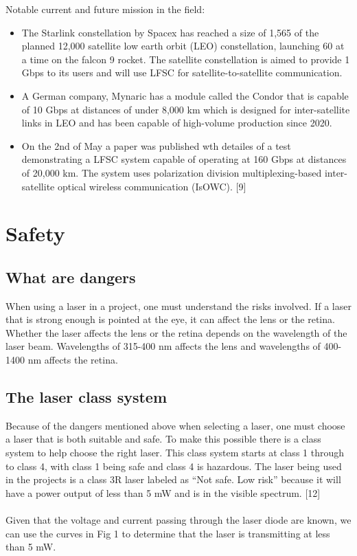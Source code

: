 \documentclass[conference]{IEEEtran}
\begin{document}
Notable current and future mission in the field:

\begin{itemize}
    \item The Starlink constellation by Spacex has reached a size of 1,565 of the planned 12,000 satellite low earth orbit (LEO) constellation, launching 60 at a time on the falcon 9 rocket. The satellite constellation is aimed to provide 1 Gbps to its users and will use LFSC for satellite-to-satellite communication. 
    \item A German company, Mynaric has a module called the Condor that is capable of 10 Gbps at distances of under 8,000 km which is designed for inter-satellite links in LEO and has been capable of high-volume production since 2020.
    \item On the 2nd of May a paper was published wth detailes of a test demonstrating a LFSC system capable of operating at 160 Gbps at distances of 20,000 km. The system uses polarization division multiplexing-based inter-satellite optical wireless communication (IsOWC). [9]
\end{itemize}

\section{Safety}

\subsection{What are dangers}

When using a laser in a project, one must understand the risks involved. If a laser that is strong enough is pointed at the eye, it can affect the lens or the retina. Whether the laser affects the lens or the retina depends on the wavelength of the laser beam. Wavelengths of 315-400 nm affects the lens and wavelengths of 400-1400 nm affects the retina. 

\subsection{The laser class system}

Because of the dangers mentioned above when selecting a laser, one must choose a laser that is both suitable and safe. To make this possible there is a class system to help choose the right laser. This class system starts at class 1 through to class 4, with class 1 being safe and class 4 is hazardous. The laser being used in the projects is a class 3R laser labeled as “Not safe. Low risk” because it will have a power output of less than 5 mW and is in the visible spectrum. [12]
\\\\
Given that the voltage and current passing through the laser diode are known, we can use the curves in Fig 1 to determine that the laser is transmitting at less than 5 mW.
\end{document}
